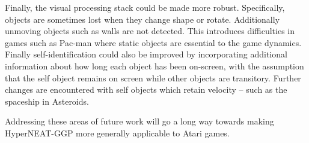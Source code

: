 \documentclass{sig-alternate}
\begin{document}


Finally, the visual processing stack could be made more robust. Specifically, objects are sometimes lost when they change shape or rotate. Additionally unmoving objects such as walls are not detected. This introduces difficulties in games such as Pac-man where static objects are essential to the game dynamics. Finally self-identification could also be improved by incorporating additional information about how long each object has been on-screen, with the assumption that the self object remains on screen while other objects are transitory. Further changes are encountered with self objects which retain velocity -- such as the spaceship in Asteroids. 

Addressing these areas of future work will go a long way towards making HyperNEAT-GGP more generally applicable to Atari games.
\end{document}
